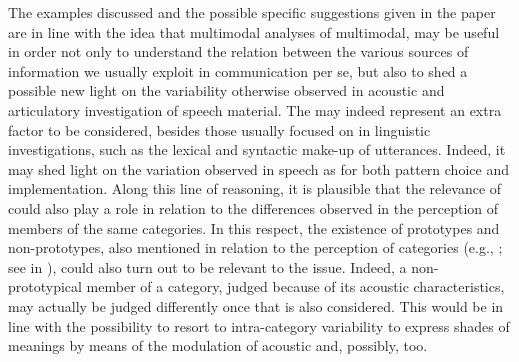 \documentclass[output=paper]{langsci/langscibook}
\begin{document}
The examples discussed and the possible specific suggestions given in the paper are in line with the idea that multimodal analyses of multimodal,  may be useful in order not only to understand the relation between the various sources of information we usually exploit in communication {per se}, but also to shed a possible new light on the variability otherwise observed in acoustic and articulatory investigation of speech material. The  may indeed represent an extra factor to be considered, besides those usually focused on in linguistic investigations, such as the lexical and syntactic make-up of utterances. Indeed, it may shed light on the variation observed in speech as for both pattern choice and  implementation. Along this line of reasoning, it is plausible that the relevance of  could also play a role in relation to the differences observed in the perception of members of the same categories. In this respect, the existence of prototypes and non-prototypes, also mentioned in relation to the perception of  categories (e.g., \citealt{Schneider2005,SchneiderEtAl2006,Schneider2009,GiliFivela2012}; see  in ), could also turn out to be relevant to the issue. Indeed, a non-prototypical member of a category, judged because of its acoustic characteristics, may actually be judged differently once that  is also considered. This would be in line with the possibility to resort to intra-category variability to express shades of meanings by means of the modulation of acoustic and, possibly,  too.

{
\sloppy
\printbibliography[heading=subbibliography,notkeyword=this]
}
\end{document}
